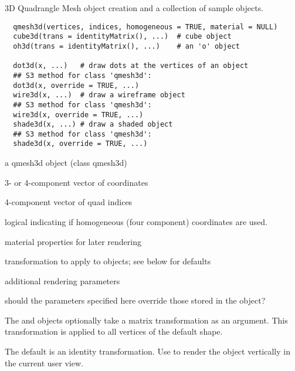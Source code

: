 \begin{Description}\relax
3D Quadrangle Mesh object creation and a collection of sample objects.
\end{Description}
\begin{Usage}
\begin{verbatim}
  qmesh3d(vertices, indices, homogeneous = TRUE, material = NULL)
  cube3d(trans = identityMatrix(), ...)  # cube object
  oh3d(trans = identityMatrix(), ...)    # an 'o' object
  
  dot3d(x, ...)   # draw dots at the vertices of an object
  ## S3 method for class 'qmesh3d':
  dot3d(x, override = TRUE, ...)
  wire3d(x, ...)  # draw a wireframe object
  ## S3 method for class 'qmesh3d':
  wire3d(x, override = TRUE, ...)
  shade3d(x, ...) # draw a shaded object
  ## S3 method for class 'qmesh3d':
  shade3d(x, override = TRUE, ...)
\end{verbatim}
\end{Usage}
\begin{Arguments}
\begin{ldescription}
\item[\code{x}] a qmesh3d object (class qmesh3d)
\item[\code{vertices}] 3- or 4-component vector of coordinates
\item[\code{indices}] 4-component vector of quad indices
\item[\code{homogeneous}] logical indicating if homogeneous (four component) coordinates are used.
\item[\code{material}] material properties for later rendering
\item[\code{trans}] transformation to apply to objects; see below for defaults
\item[\code{...}] additional rendering parameters
\item[\code{override}] should the parameters specified here override those stored in the object?
\end{ldescription}
\end{Arguments}
\begin{Details}\relax
The  and  objects optionally take a matrix transformation as 
an argument.  This transformation is applied to all vertices of the default shape.

The default is an identity transformation.  Use  to render the
object vertically in the current user view.
\end{Details}
